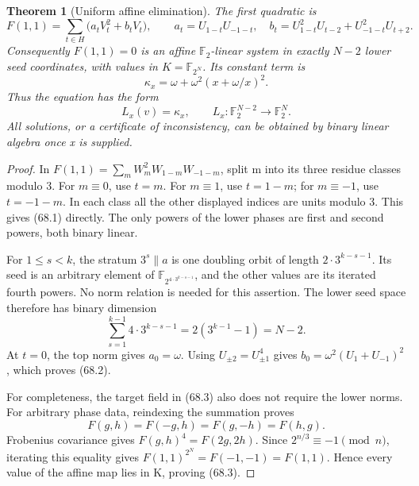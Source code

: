 \documentclass[11pt,reqno]{amsart}
\theoremstyle{plain}
\newtheorem{theorem}{Theorem}[section]
\begin{document}
\begin{theorem}[Uniform affine elimination]
The first quadratic is
\begin{equation*}
 \boxed{\displaystyle
 F(1,1)=\sum_{t\in H}\bigl(a_t V_t^2+b_t V_t\bigr),\qquad
 a_t=U_{1-t}U_{-1-t},\quad
 b_t=U_{1-t}^2U_{t-2}+U_{-1-t}^2U_{t+2}.
 }\tag{68.1}
\end{equation*}
Consequently \(F(1,1)=0\) is an affine \(\mathbb F_2\)-linear
system in exactly \(N-2\) lower seed coordinates, with values in
\(K=\mathbb F_{2^N}\). Its constant term is
\begin{equation*}
 \kappa_x=\omega+\omega^2(x+\omega/x)^2.
 \tag{68.2}
\end{equation*}
Thus the equation has the form
\begin{equation*}
 L_x(v)=\kappa_x,\qquad
 L_x:\mathbb F_2^{N-2}\longrightarrow\mathbb F_2^N.
 \tag{68.3}
\end{equation*}
All solutions, or a certificate of inconsistency, can be obtained by
binary linear algebra once x is supplied.
\end{theorem}

\begin{proof}
In
\(F(1,1)=\sum_m W_m^2W_{1-m}W_{-1-m}\), split m into its three
residue classes modulo 3. For \(m\equiv0\), use \(t=m\).
For \(m\equiv1\), use \(t=1-m\); for \(m\equiv-1\), use
\(t=-1-m\). In each class all the other displayed indices are
units modulo 3. This gives (68.1) directly. The only powers of the
lower phases are first and second powers, both binary linear.

For \(1\le s<k\), the stratum \(3^s\parallel a\) is one
doubling orbit of length \(2\cdot3^{k-s-1}\). Its seed is an
arbitrary element of
\(\mathbb F_{2^{4\cdot3^{k-s-1}}}\), and the other values are its
iterated fourth powers. No norm relation is needed for this assertion.
The lower seed space therefore has binary dimension
\begin{equation*}
 \sum_{s=1}^{k-1}4\cdot3^{k-s-1}
 =2(3^{k-1}-1)=N-2.
 \tag{68.4}
\end{equation*}
At \(t=0\), the top norm gives \(a_0=\omega\). Using
\(U_{\pm2}=U_{\pm1}^4\) gives
\(b_0=\omega^2(U_1+U_{-1})^2\), which proves (68.2).

For completeness, the target field in (68.3) also does not require
the lower norms. For arbitrary phase data, reindexing the summation
proves
\begin{equation*}
 F(g,h)=F(-g,h)=F(g,-h)=F(h,g).
 \tag{68.5}
\end{equation*}
Frobenius covariance gives \(F(g,h)^4=F(2g,2h)\). Since
\(2^{n/3}\equiv-1\pmod n\), iterating this equality gives
\(F(1,1)^{2^N}=F(-1,-1)=F(1,1)\). Hence every value of the
affine map lies in K, proving (68.3).
\end{proof}
\end{document}
